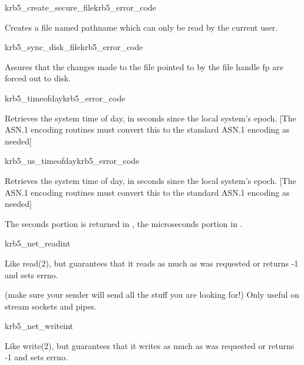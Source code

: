 \begin{funcdecl}{krb5_create_secure_file}{krb5_error_code}{\funcin}
\end{funcdecl}

Creates a file named pathname which can only be read by the current
user.

\begin{funcdecl}{krb5_sync_disk_file}{krb5_error_code}{\funcin}
\end{funcdecl}

Assures that the changes made to the file pointed to by the file
handle
fp are forced out to disk.

\begin{funcdecl}{krb5_timeofday}{krb5_error_code}{\funcout}
\end{funcdecl}

Retrieves the system time of day, in seconds since the local system's
epoch.
[The ASN.1 encoding routines must convert this to the standard ASN.1
encoding as needed]

\begin{funcdecl}{krb5_us_timeofday}{krb5_error_code}{\funcout}
\end{funcdecl}

Retrieves the system time of day, in seconds since the local system's
epoch.
[The ASN.1 encoding routines must convert this to the standard ASN.1
encoding as needed]

The seconds portion is returned in , the
microseconds portion in .

\begin{funcdecl}{krb5_net_read}{int}{\funcin}
\funcout
{}
\funcin
{}
\end{funcdecl}

Like read(2), but guarantees that it reads as much as was requested
or returns -1 and sets errno.

(make sure your sender will send all the stuff you are looking for!)
Only useful on stream sockets and pipes.

\begin{funcdecl}{krb5_net_write}{int}{\funcin}
\end{funcdecl}

Like write(2), but guarantees that it writes as much as was requested
or returns -1 and sets errno.

